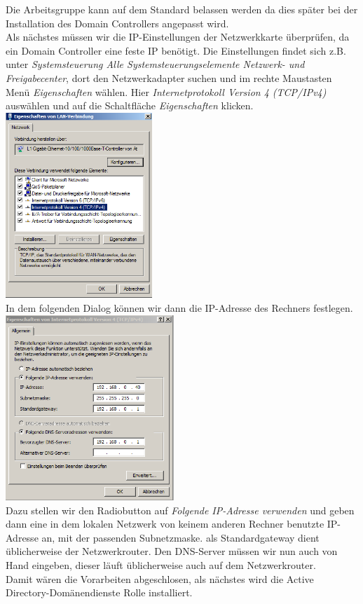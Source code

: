 \documentclass[12pt,a4paper,titlepage]{scrartcl} %
\begin{document}
Die Arbeitsgruppe kann auf dem Standard belassen werden da dies später bei der Installation des Domain Controllers angepasst wird.\\
Als nächstes müssen wir die IP-Einstellungen der Netzwerkkarte überprüfen, da ein Domain Controller eine feste IP benötigt. Die Einstellungen findet sich z.B. unter \emph{Systemsteuerung  Alle Systemsteuerungselemente  Netzwerk- und Freigabecenter}, dort den Netzwerkadapter suchen und im rechte Maustasten Menü \emph{Eigenschaften} wählen. Hier \emph{Internetprotokoll Version 4 (TCP/IPv4)} auswählen und auf die Schaltfläche \emph{Eigenschaften} klicken.\\ %

	\includegraphics[height=7cm]{Bilder/004}\\
	
In dem folgenden Dialog können wir dann die IP-Adresse des Rechners festlegen.\\ 

	\includegraphics[height=7cm]{Bilder/005}\\
	
Dazu stellen wir den Radiobutton auf \emph{Folgende IP-Adresse verwenden} und geben dann eine in dem lokalen Netzwerk von keinem anderen Rechner benutzte IP-Adresse an, mit der passenden Subnetzmaske. als Standardgateway dient üblicherweise der Netzwerkrouter. Den DNS-Server müssen wir nun auch von Hand eingeben, dieser läuft üblicherweise auch auf dem Netzwerkrouter.\\
Damit wären die Vorarbeiten abgeschlosen, als nächstes wird die Active Directory-Domänendienste Rolle installiert.
\end{document}
